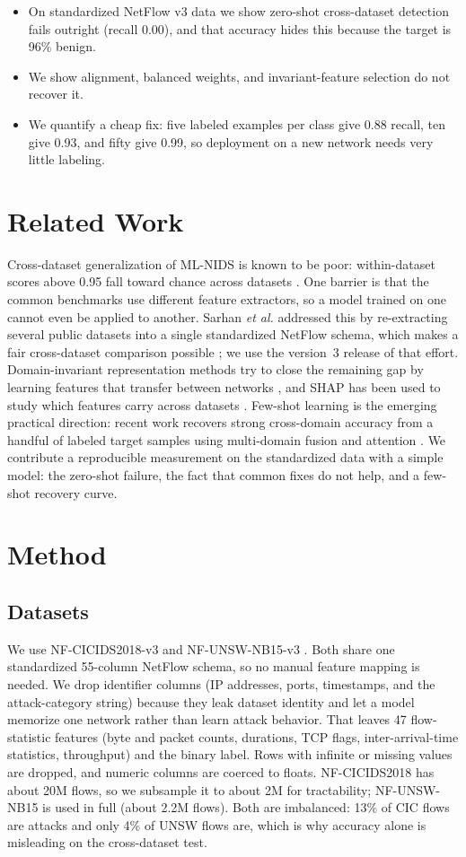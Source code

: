 \documentclass[conference]{IEEEtran}
\begin{document}
\begin{itemize}
\item On standardized NetFlow v3 data we show zero-shot cross-dataset detection fails outright
(recall 0.00), and that accuracy hides this because the target is 96\% benign.
\item We show alignment, balanced weights, and invariant-feature selection do not recover it.
\item We quantify a cheap fix: five labeled examples per class give 0.88 recall, ten give 0.93,
and fifty give 0.99, so deployment on a new network needs very little labeling.
\end{itemize}

\section{Related Work}
Cross-dataset generalization of ML-NIDS is known to be poor: within-dataset scores above 0.95 fall
toward chance across datasets \cite{crossdataset}. One barrier is that the common benchmarks use
different feature extractors, so a model trained on one cannot even be applied to another. Sarhan
\emph{et al.} addressed this by re-extracting several public datasets into a single standardized
NetFlow schema, which makes a fair cross-dataset comparison possible \cite{netflow}; we use the
version~3 release of that effort. Domain-invariant representation methods try to close the remaining
gap by learning features that transfer between networks \cite{dinids}, and SHAP has been used to
study which features carry across datasets \cite{shapfs}. Few-shot learning is the emerging practical
direction: recent work recovers strong cross-domain accuracy from a handful of labeled target
samples using multi-domain fusion and attention \cite{fewshot}. We contribute a reproducible
measurement on the standardized data with a simple model: the zero-shot failure, the fact that
common fixes do not help, and a few-shot recovery curve.

\section{Method}
\subsection{Datasets}
We use NF-CICIDS2018-v3 and NF-UNSW-NB15-v3 \cite{netflow}. Both share one standardized 55-column
NetFlow schema, so no manual feature mapping is needed. We drop identifier columns (IP addresses,
ports, timestamps, and the attack-category string) because they leak dataset identity and let a
model memorize one network rather than learn attack behavior. That leaves 47 flow-statistic features
(byte and packet counts, durations, TCP flags, inter-arrival-time statistics, throughput) and the
binary label. Rows with infinite or missing values are dropped, and numeric columns are coerced to
floats. NF-CICIDS2018 has about 20M flows, so we subsample it to about 2M for tractability;
NF-UNSW-NB15 is used in full (about 2.2M flows). Both are imbalanced: 13\% of CIC flows are attacks
and only 4\% of UNSW flows are, which is why accuracy alone is misleading on the cross-dataset test.
\end{document}
